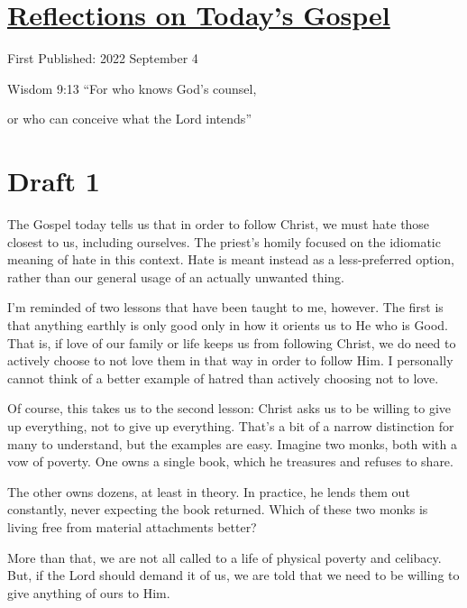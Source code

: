 \documentclass[12pt]{article}[titlepage]
\newcommand{\say}[1]{``#1''}
\newcommand{\1}{\={a}}
\newcommand{\2}{\={e}}
\newcommand{\3}{\={\i}}
\newcommand{\4}{\=o}
\newcommand{\5}{\=u}
\newcommand{\6}{\={A}}
\renewcommand{\,}{\textsuperscript{,}}
\begin{document}
\doublespacing
\section{\href{reflections-on-readings-22-ordinary-c-22.html}{Reflections on Today's Gospel}}
First Published: 2022 September 4

Wisdom 9:13 \say{For who knows God's counsel,

or who can conceive what the Lord intends}

\section{Draft 1}
The Gospel today tells us that in order to follow Christ, we must hate those closest to us, including ourselves.
The priest's homily focused on the idiomatic meaning of hate in this context.
Hate is meant instead as a less-preferred option, rather than our general usage of an actually unwanted thing.

I'm reminded of two lessons that have been taught to me, however.
The first is that anything earthly is only good only in how it orients us to He who is Good.
That is, if love of our family or life keeps us from following Christ, we do need to actively choose to not love them in that way in order to follow Him.
I personally cannot think of a better example of hatred than actively choosing not to love.

Of course, this takes us to the second lesson: Christ asks us to be willing to give up everything, not to give up everything.
That's a bit of a narrow distinction for many to understand, but the examples are easy.
Imagine two monks, both with a vow of poverty.
One owns a single book, which he treasures and refuses to share.

The other owns dozens, at least in theory.
In practice, he lends them out constantly, never expecting the book returned.
Which of these two monks is living free from material attachments better?

More than that, we are not all called to a life of physical poverty and celibacy.
But, if the Lord should demand it of us, we are told that we need to be willing to give anything of ours to Him.
\end{document}
